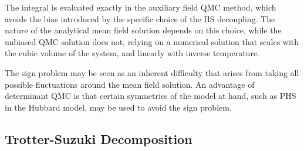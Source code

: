 The integral is evaluated exactly in the auxiliary field \acs{QMC} method, which avoids the bias introduced by the specific choice of the HS decoupling.
The nature of the analytical mean field solution depends on this choice, while the unbiased \acs{QMC} solution does not, relying on a numerical solution that scales with the cubic volume of the system, and linearly with inverse temperature.

The sign problem may be seen as an inherent difficulty that arises from taking all possible fluctuations around the mean field solution.
An advantage of determinant \acs{QMC} is that certain symmetries of the model at hand, such as \acs{PHS} in the Hubbard model, may be used to avoid the sign problem.

\subsection{Trotter-Suzuki Decomposition}
\label{subsec:trotter}

